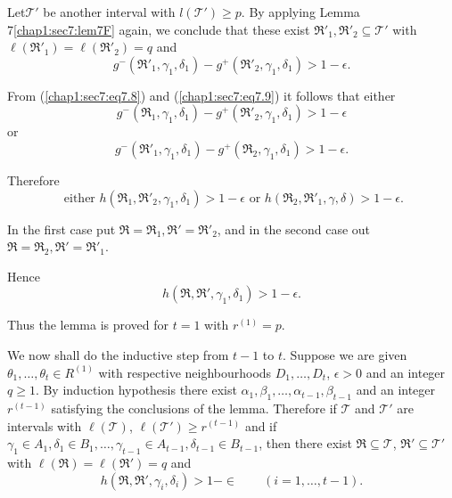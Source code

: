 Let\pageoriginale $\mathscr{T}'$ be another interval with $l(\mathscr{T}') \geq p$. By applying Lemma 7\ref{chap1:sec7:lem7F} again, we conclude that these exist $\mathfrak{R}'_{1}, \mathfrak{R}'_{2} \subseteq \mathscr{T}'$ with $\ell (\mathfrak{R}'_{1}) = \ell (\mathfrak{R}'_{2}) = q$ and 
\begin{equation*}
g^{-} (\mathfrak{R}'_{1}, \gamma_{1}, \delta_{1}) - g^{+} (\mathfrak{R}'_{2}, \gamma_{1}, \delta_{1}) > 1 - \epsilon.\tag{7.9}\label{chap1:sec7:eq7.9}
\end{equation*}

From (\ref{chap1:sec7:eq7.8}) and (\ref{chap1:sec7:eq7.9}) it follows that either
$$
g^{-} (\mathfrak{R}_{1}, \gamma_{1}, \delta_{1}) - g^{+} (\mathfrak{R}'_{2}, \gamma_{1}, \delta_{1}) > 1 - \epsilon
$$
or 
$$
g^{-} (\mathfrak{R}'_{1}, \gamma_{1}, \delta_{1}) - g^{+} (\mathfrak{R}_{2}, \gamma_{1}, \delta_{1}) > 1 - \epsilon.
$$

Therefore 
$$
\text{ either } h(\mathfrak{R}_{1}, \mathfrak{R}'_{2}, \gamma_{1}, \delta_{1}) > 1 - \epsilon \text{ or } h(\mathfrak{R}_{2}, \mathfrak{R}'_{1}, \gamma, \delta) > 1 - \epsilon.
$$

In the first case put $\mathfrak{R} = \mathfrak{R}_{1}, \mathfrak{R}' = \mathfrak{R}'_{2}$, and in the second case out $\mathfrak{R} = \mathfrak{R}_{2}, \mathfrak{R}' = \mathfrak{R}'_{1}$.

Hence
$$
h(\mathfrak{R}, \mathfrak{R}', \gamma_{1}, \delta_{1}) > 1 - \epsilon.
$$

Thus the lemma is proved for $t = 1$ with $r^{(1)} = p$.

We now shall do the inductive step from $t-1$ to $t$. Suppose we are given $\theta_{1}, \ldots, \theta_{t} \in R^{(1)}$ with respective neighbourhoods $D_{1}, \ldots, D_{t}$, $\epsilon > 0$ and an integer $q \geq 1$. By induction hypothesis there exist $\alpha_{1}, \beta_{1}, \ldots, \alpha_{t-1}, \beta_{t-1}$ and an integer $r^{(t-1)}$ satisfying the conclusions of the lemma. Therefore if $\mathscr{T}$ and $\mathscr{T}'$ are intervals with $\ell (\mathscr{T})$, $\ell(\mathscr{T}') \geq r^{(t-1)}$ and if $\gamma_{1} \in A_{1}, \delta_{1} \in B_{1}, \ldots, \gamma_{t-1} \in A_{t-1}, \delta_{t-1} \in B_{t-1}$, then there exist $\mathfrak{R} \subseteq \mathscr{T}$, $\mathfrak{R}' \subseteq \mathscr{T}'$ with $\ell (\mathfrak{R}) = \ell (\mathfrak{R}') = q$ and 
\begin{equation*}
h(\mathfrak{R}, \mathfrak{R}', \gamma_{i}, \delta_{i}) > 1 - \in \qquad(i = 1, \ldots, t-1).\tag{7.10}\label{chap1:sec7:eq7.10}
\end{equation*}

